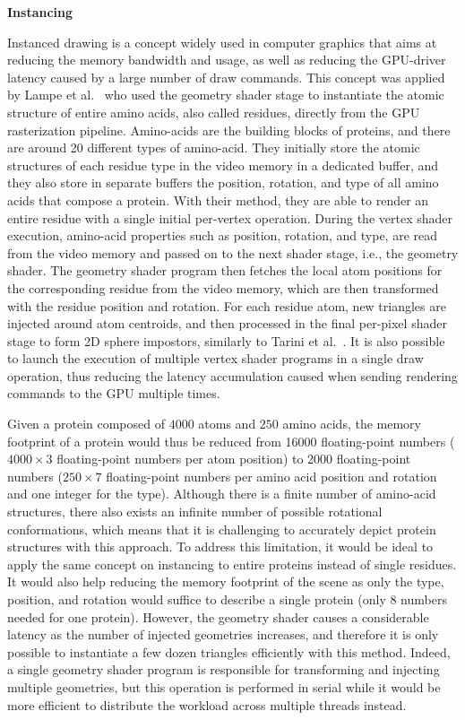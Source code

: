 \textbf{Instancing}

Instanced drawing is a concept widely used in computer graphics that aims at reducing the memory bandwidth and usage, as well as reducing the GPU-driver latency caused by a large number of draw commands.
This concept was applied by Lampe et al.~\cite{lampe2007two} who used the geometry shader stage to instantiate the atomic structure of entire amino acids, also called residues, directly from the GPU rasterization pipeline.
Amino-acids are the building blocks of proteins, and there are around 20 different types of amino-acid.
They initially store the atomic structures of each residue type in the video memory in a dedicated buffer, and they also store in separate buffers the position, rotation, and type of all amino acids that compose a protein.
With their method, they are able to render an entire residue with a single initial per-vertex operation.
During the vertex shader execution, amino-acid properties such as position, rotation, and type, are read from the video memory and passed on to the next shader stage, i.e., the geometry shader.
The geometry shader program then fetches the local atom positions for the corresponding residue from the video memory, which are then transformed with the residue position and rotation.
For each residue atom, new triangles are injected around atom centroids, and then processed in the final per-pixel shader stage to form 2D sphere impostors, similarly to Tarini et al.~\cite{tarini2006ambient}.
It is also possible to launch the execution of multiple vertex shader programs in a single draw operation, thus reducing the latency accumulation caused when sending rendering commands to the GPU multiple times.

Given a protein composed of $4000$ atoms and $250$ amino acids, the memory footprint of a protein would thus be reduced from 16000 floating-point numbers ($4000 \times 3$ floating-point numbers per atom position) to 2000 floating-point numbers ($250 \times 7$ floating-point numbers per amino acid position and rotation and one integer for the type).
Although there is a finite number of amino-acid structures, there also exists an infinite number of possible rotational conformations, which means that it is challenging to accurately depict protein structures with this approach.
To address this limitation, it would be ideal to apply the same concept on instancing to entire proteins instead of single residues.
It would also help reducing the memory footprint of the scene as only the type, position, and rotation would suffice to describe a single protein (only 8 numbers needed for one protein).
However, the geometry shader causes a considerable latency as the number of injected geometries increases, and therefore it is only possible to instantiate a few dozen triangles efficiently with this method.
Indeed, a single geometry shader program is responsible for transforming and injecting multiple geometries, but this operation is performed in serial while it would be more efficient to distribute the workload across multiple threads instead.

